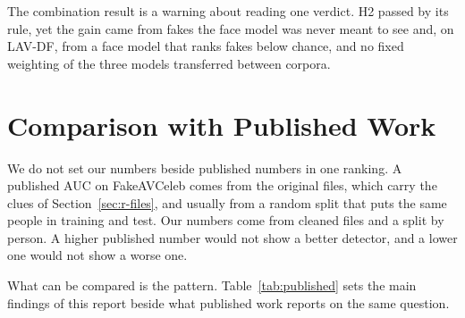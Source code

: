 The combination result is a warning about reading one verdict. H2 passed by
its rule, yet the gain came from fakes the face model was never meant to see
and, on LAV-DF, from a face model that ranks fakes below chance, and no fixed
weighting of the three models transferred between corpora.

\section{Comparison with Published Work}
\label{sec:r-published}

We do not set our numbers beside published numbers in one ranking. A
published AUC on FakeAVCeleb comes from the original files, which carry the
clues of Section~\ref{sec:r-files}, and usually from a random split that puts
the same people in training and test. Our numbers come from cleaned files and
a split by person. A higher published number would not show a better
detector, and a lower one would not show a worse one.

What can be compared is the pattern. Table~\ref{tab:published} sets the main
findings of this report beside what published work reports on the same
question.

